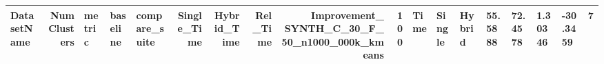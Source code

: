 \begin{tabular}{lrlllrrrrr}
\toprule
DatasetName & NumClusters & metric & baseline & compare_suite & Single_Time & Hybrid_Time & Rel_Time & Improvement_%
\midrule
SYNTH_C_30_F_50_n1000_000k_kmeans & 100 & Time & Single & Hybrid & 55.5888 & 72.4578 & 1.30346 & -30.3459 & 7 \\
\bottomrule
\end{tabular}
